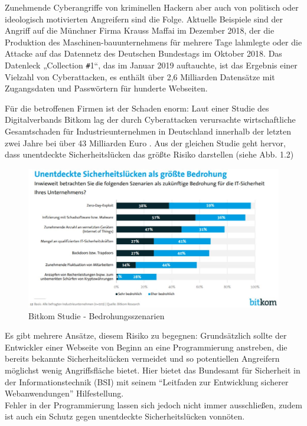 \documentclass[12pt,oneside,a4paper,parskip]{scrbook}
\begin{document}
Zunehmende Cyberangriffe von kriminellen Hackern aber auch von politisch oder ideologisch motivierten Angreifern sind die Folge. Aktuelle Beispiele sind der Angriff auf die Münchner Firma Krauss Maffai im Dezember 2018, der die Produktion des Maschinen-bauunternehmens für mehrere Tage lahmlegte oder die Attacke auf das Datennetz des Deutschen Bundestags im Oktober 2018. Das Datenleck „Collection \texttt{\#}1“, das im Januar 2019 auftauchte, ist das Ergebnis einer Vielzahl von Cyberattacken, es enthält über 2,6 Milliarden Datensätze mit Zugangsdaten und Passwörtern für hunderte Webseiten.

Für die betroffenen Firmen ist der Schaden enorm: Laut einer Studie des Digitalverbands Bitkom lag der durch Cyberattacken verursachte wirtschaftliche Gesamtschaden für Industrieunternehmen in Deutschland innerhalb der letzten zwei Jahre bei über 43 Milliarden Euro \cite{Bitkom}. Aus der gleichen Studie geht hervor, dass unentdeckte Sicherheitslücken das größte Risiko darstellen (siehe Abb. 1.2)\\

\begin{figure}[htb!]
  \centering
   \includegraphics[width=1\textwidth]{Images/Bitkom}
  \caption[Bitkom Studie - Bedrohungsszenarien]{Bitkom Studie - Bedrohungsszenarien \cite{Bitkom}}
\end{figure}
Es gibt mehrere Ansätze, diesem Risiko zu begegnen: Grundsätzlich sollte der Entwickler einer Webseite von Beginn an eine Programmierung anstreben, die bereits bekannte Sicherheitslücken vermeidet und so potentiellen Angreifern möglichst wenig Angriffsfläche bietet. Hier bietet das Bundesamt für Sicherheit in der Informationstechnik (BSI) mit seinem ``Leitfaden zur Entwicklung sicherer Webanwendungen''  \cite{BSI} Hilfestellung.\\
Fehler in der Programmierung lassen sich jedoch nicht immer ausschließen, zudem ist auch ein Schutz gegen unentdeckte Sicherheitslücken vonnöten.
\end{document}
